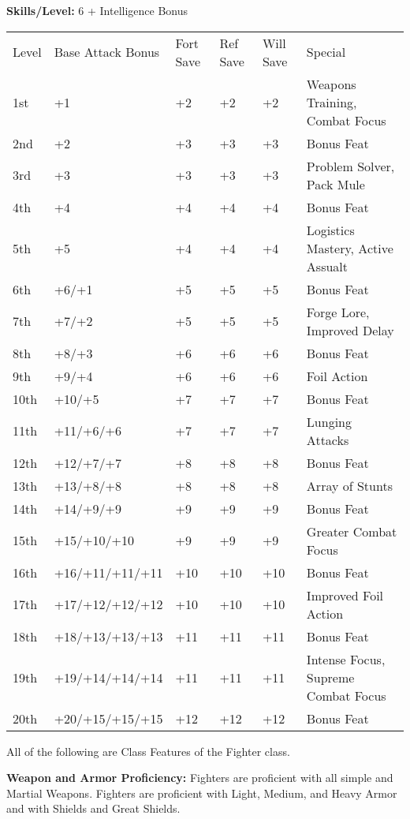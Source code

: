 \documentclass[10pt]{article}
\newcommand{\ability}[2]{\smallskip \noindent \textbf{#1} #2}
\begin{document}
\ability{Skills/Level:}{6 + Intelligence Bonus}

\begin{table}[tbh]
\begin{small}
\begin{tabular}{lp{3cm}p{0.7cm}p{0.7cm}p{0.7cm}l}
Level  &Base Attack Bonus &Fort Save &Ref Save &Will Save &Special\\
1st &+1 &+2 &+2 &+2 &Weapons Training, Combat Focus\\
2nd &+2 &+3 &+3 &+3 &Bonus Feat\\
3rd &+3 &+3 &+3 &+3 &Problem Solver, Pack Mule\\
4th &+4 &+4 &+4 &+4 &Bonus Feat\\
5th &+5 &+4 &+4 &+4 &Logistics Mastery, Active Assualt\\
6th &+6/+1 &+5 &+5 &+5 &Bonus Feat\\
7th &+7/+2 &+5 &+5 &+5 &Forge Lore, Improved Delay\\
8th &+8/+3 &+6 &+6 &+6 &Bonus Feat\\
9th &+9/+4 &+6 &+6 &+6 &Foil Action\\
10th &+10/+5 &+7 &+7 &+7 &Bonus Feat\\
11th &+11/+6/+6 &+7 &+7 &+7 &Lunging Attacks\\
12th &+12/+7/+7 &+8 &+8 &+8 &Bonus Feat\\
13th &+13/+8/+8 &+8 &+8 &+8 &Array of Stunts\\
14th &+14/+9/+9 &+9 &+9 &+9 &Bonus Feat\\
15th &+15/+10/+10 &+9 &+9 &+9 &Greater Combat Focus\\
16th &+16/+11/+11/+11 &+10 &+10 &+10 &Bonus Feat\\
17th &+17/+12/+12/+12 &+10 &+10 &+10 &Improved Foil Action\\
18th &+18/+13/+13/+13 &+11 &+11 &+11 &Bonus Feat\\
19th &+19/+14/+14/+14 &+11 &+11 &+11 &Intense Focus, Supreme Combat Focus\\
20th &+20/+15/+15/+15 &+12 &+12 &+12 &Bonus Feat\\
\end{tabular}
\end{small}
\end{table}


\noindent All of the following are Class Features of the Fighter class.

\ability{Weapon and Armor Proficiency:}{Fighters are proficient with all simple and Martial Weapons. Fighters are proficient with Light, Medium, and Heavy Armor and with Shields and Great Shields.}
\end{document}
